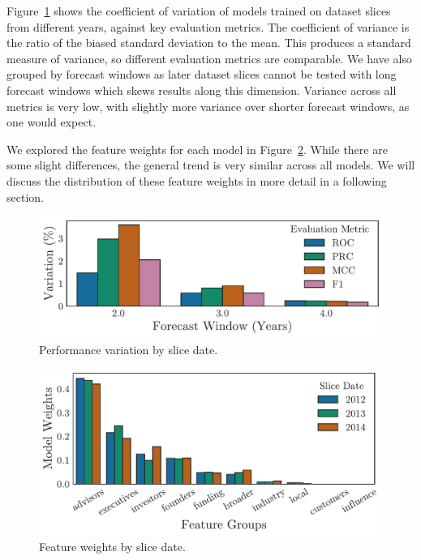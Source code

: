 ﻿\documentclass[../thesis/thesis.tex]{subfiles}
\begin{document}
Figure~\ref{fig:evaluation:f1_robustness_slice} shows the coefficient of variation of models trained on dataset slices from different years, against key evaluation metrics. The coefficient of variance is the ratio of the biased standard deviation to the mean. This produces a standard measure of variance, so different evaluation metrics are comparable. We have also grouped by forecast windows as later dataset slices cannot be tested with long forecast windows which skews results along this dimension. Variance across all metrics is very low, with slightly more variance over shorter forecast windows, as one would expect.

We explored the feature weights for each model in Figure~\ref{fig:evaluation:feature_groups_slice}. While there are some slight differences, the general trend is very similar across all models. We will discuss the distribution of these feature weights in more detail in a following section.

\begin{figure}[!htb]
    \centering
    \includegraphics[width=\textwidth]{../figures/evaluation/performance_slice}
    \caption[Performance variation by slice date]{Performance variation by slice date.}
    \label{fig:evaluation:f1_robustness_slice}
\end{figure}

\begin{figure}[!htb] %
    \centering
    \includegraphics[width=\textwidth]{../figures/evaluation/features_slice}
    \caption[Feature weights by slice date]{Feature weights by slice date.}
    \label{fig:evaluation:feature_groups_slice}
\end{figure}
\end{document}
